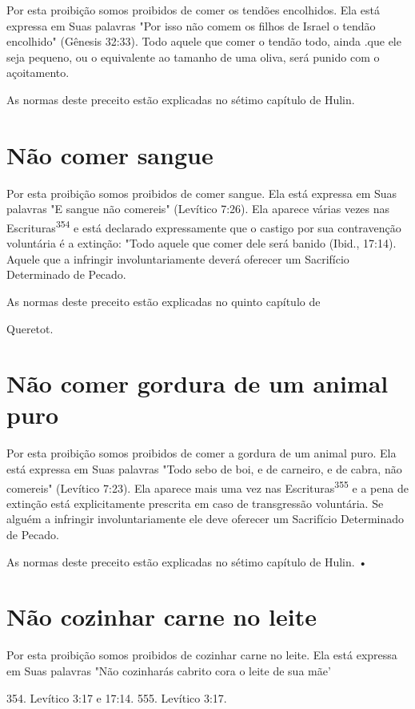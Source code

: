 \begin{itemize}
\begin{enumrate}
\begin{itemize}
\begin{itemize}
\begin{itemize}
Por esta proibição somos proibidos de comer os tendões encolhi­dos. Ela
está expressa em Suas palavras "Por isso não comem os filhos de Israel o
tendão encolhido" (Gênesis 32:33). Todo aquele que comer o tendão todo,
ainda .que ele seja pequeno, ou o equivalente ao tamanho de uma oliva,
será punido com o açoitamento.


As normas deste preceito estão explicadas no sétimo capítulo de Hulin.


\section{Não comer sangue}

Por esta proibição somos proibidos de comer sangue. Ela está ex­pressa
em Suas palavras "E sangue não comereis" (Levítico 7:26). Ela aparece
várias vezes nas Escrituras\textsuperscript{354} e está declarado
expressamente que o castigo por sua contravenção voluntária é a
extinção: "Todo aquele que comer dele será banido (Ibid., 17:14). Aquele
que a infringir involuntariamente deverá oferecer um Sacrifício
Determinado de Pecado.


As normas deste preceito estão explicadas no quinto capítulo de


Queretot.

\section{Não comer gordura de um animal puro}

Por esta proibição somos proibidos de comer a gordura de um ani­mal
puro. Ela está expressa em Suas palavras "Todo sebo de boi, e de
carneiro, e de cabra, não comereis" (Levítico 7:23). Ela aparece mais
uma vez nas Escrituras\textsuperscript{355} e a pena de extinção está
explicitamente prescrita em caso de transgressão voluntária. Se alguém a
infringir involuntariamente ele deve ofe­recer um Sacrifício Determinado
de Pecado.


As normas deste preceito estão explicadas no sétimo capítulo de Hulin. •


\section{Não cozinhar carne no leite}

Por esta proibição somos proibidos de cozinhar carne no leite. Ela está
expressa em Suas palavras "Não cozinharás cabrito cora o leite de sua
mãe'

354. Levítico 3:17 e 17:14. 555. Levítico 3:17.


\end{itemize}
\end{itemize}
\end{itemize}
\end{enumrate}
\end{itemize}
